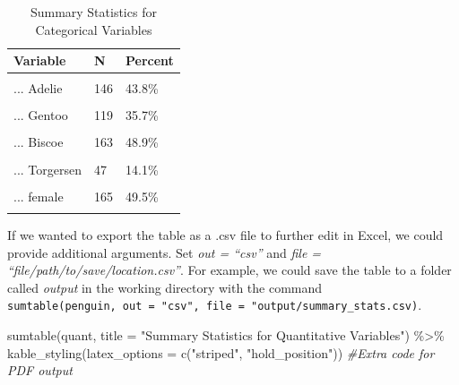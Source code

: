 \documentclass[
]{article}
\newenvironment{Shaded}{\begin{snugshade}}{\end{snugshade}}
\newcommand{\AttributeTok}[1]{\textcolor[rgb]{0.77,0.63,0.00}{#1}}
\newcommand{\CommentTok}[1]{\textcolor[rgb]{0.56,0.35,0.01}{\textit{#1}}}
\newcommand{\FunctionTok}[1]{\textcolor[rgb]{0.00,0.00,0.00}{#1}}
\newcommand{\NormalTok}[1]{#1}
\newcommand{\SpecialCharTok}[1]{\textcolor[rgb]{0.00,0.00,0.00}{#1}}
\newcommand{\StringTok}[1]{\textcolor[rgb]{0.31,0.60,0.02}{#1}}
\begin{document}
\begin{table}[!h]

\caption{\label{tab:summary stats}Summary Statistics for Categorical Variables}
\centering
\begin{tabular}[t]{lll}
\toprule
Variable & N & Percent\\
\midrule
\cellcolor{gray!6}{species} & \cellcolor{gray!6}{333} & \cellcolor{gray!6}{}\\
... Adelie & 146 & 43.8\%\\
\cellcolor{gray!6}{... Chinstrap} & \cellcolor{gray!6}{68} & \cellcolor{gray!6}{20.4\%}\\
... Gentoo & 119 & 35.7\%\\
\cellcolor{gray!6}{island} & \cellcolor{gray!6}{333} & \cellcolor{gray!6}{}\\
\addlinespace
... Biscoe & 163 & 48.9\%\\
\cellcolor{gray!6}{... Dream} & \cellcolor{gray!6}{123} & \cellcolor{gray!6}{36.9\%}\\
... Torgersen & 47 & 14.1\%\\
\cellcolor{gray!6}{sex} & \cellcolor{gray!6}{333} & \cellcolor{gray!6}{}\\
... female & 165 & 49.5\%\\
\addlinespace
\cellcolor{gray!6}{... male} & \cellcolor{gray!6}{168} & \cellcolor{gray!6}{50.5\%}\\
\bottomrule
\end{tabular}
\end{table}

If we wanted to export the table as a .csv file to further edit in
Excel, we could provide additional arguments. Set \emph{out = ``csv''}
and \emph{file = ``file/path/to/save/location.csv''}. For example, we
could save the table to a folder called \emph{output} in the working
directory with the command
\texttt{sumtable(penguin,\ out\ =\ "csv",\ file\ =\ "output/summary\_stats.csv)}.

\begin{Shaded}
\begin{Highlighting}[]
\FunctionTok{sumtable}\NormalTok{(quant, }\AttributeTok{title =} \StringTok{"Summary Statistics for Quantitative Variables"}\NormalTok{) }\SpecialCharTok{\%\textgreater{}\%} 
  \FunctionTok{kable\_styling}\NormalTok{(}\AttributeTok{latex\_options =} \FunctionTok{c}\NormalTok{(}\StringTok{"striped"}\NormalTok{, }\StringTok{"hold\_position"}\NormalTok{)) }\CommentTok{\#Extra code for PDF output}
\end{Highlighting}
\end{Shaded}
\end{document}

